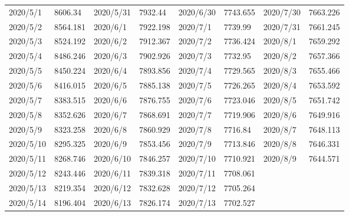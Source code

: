 \documentclass[a4paper, 11pt,twoside=true]{scrartcl}
\begin{document}
\begin{table}[H]
\begin{tabular}{llllllll}
		2020/5/1  & 8606.34  & 2020/5/31 & 7932.44  & 2020/6/30 & 7743.655 & 2020/7/30 & 7663.226 \\
		2020/5/2  & 8564.181 & 2020/6/1  & 7922.198 & 2020/7/1  & 7739.99  & 2020/7/31 & 7661.245 \\
		2020/5/3  & 8524.192 & 2020/6/2  & 7912.367 & 2020/7/2  & 7736.424 & 2020/8/1  & 7659.292 \\
		2020/5/4  & 8486.246 & 2020/6/3  & 7902.926 & 2020/7/3  & 7732.95  & 2020/8/2  & 7657.366 \\
		2020/5/5  & 8450.224 & 2020/6/4  & 7893.856 & 2020/7/4  & 7729.565 & 2020/8/3  & 7655.466 \\
		2020/5/6  & 8416.015 & 2020/6/5  & 7885.138 & 2020/7/5  & 7726.265 & 2020/8/4  & 7653.592 \\
		2020/5/7  & 8383.515 & 2020/6/6  & 7876.755 & 2020/7/6  & 7723.046 & 2020/8/5  & 7651.742 \\
		2020/5/8  & 8352.626 & 2020/6/7  & 7868.691 & 2020/7/7  & 7719.906 & 2020/8/6  & 7649.916 \\
		2020/5/9  & 8323.258 & 2020/6/8  & 7860.929 & 2020/7/8  & 7716.84  & 2020/8/7  & 7648.113 \\
		2020/5/10 & 8295.325 & 2020/6/9  & 7853.456 & 2020/7/9  & 7713.846 & 2020/8/8  & 7646.331 \\
		2020/5/11 & 8268.746 & 2020/6/10 & 7846.257 & 2020/7/10 & 7710.921 & 2020/8/9  & 7644.571 \\
		2020/5/12 & 8243.446 & 2020/6/11 & 7839.318 & 2020/7/11 & 7708.061 &           &          \\
		2020/5/13 & 8219.354 & 2020/6/12 & 7832.628 & 2020/7/12 & 7705.264 &           &          \\
		2020/5/14 & 8196.404 & 2020/6/13 & 7826.174 & 2020/7/13 & 7702.527 &           &          \\ \hline
	\end{tabular}
\end{table}


\newpage
\end{document}
